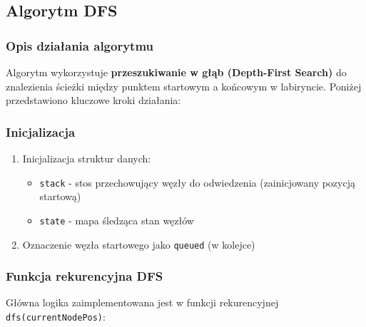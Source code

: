 \documentclass[../../../../doc.tex]{subfiles}
\begin{document}
\subsection{Algorytm DFS}





\subsubsection{Opis działania algorytmu}

Algorytm wykorzystuje \textbf{przeszukiwanie w głąb (Depth-First Search)} do znalezienia ścieżki między punktem startowym a końcowym w labiryncie. Poniżej przedstawiono kluczowe kroki działania:

\subsubsection{Inicjalizacja}
\begin{enumerate}
  \item Inicjalizacja struktur danych:
        \begin{itemize}
          \item \texttt{stack} - stos przechowujący węzły do odwiedzenia (zainicjowany pozycją startową)
          \item \texttt{state} - mapa śledząca stan węzłów
        \end{itemize}
  \item Oznaczenie węzła startowego jako \texttt{queued} (w kolejce)
\end{enumerate}

\subsubsection{Funkcja rekurencyjna DFS}
Główna logika zaimplementowana jest w funkcji rekurencyjnej \texttt{dfs(currentNodePos)}:
\end{document}
